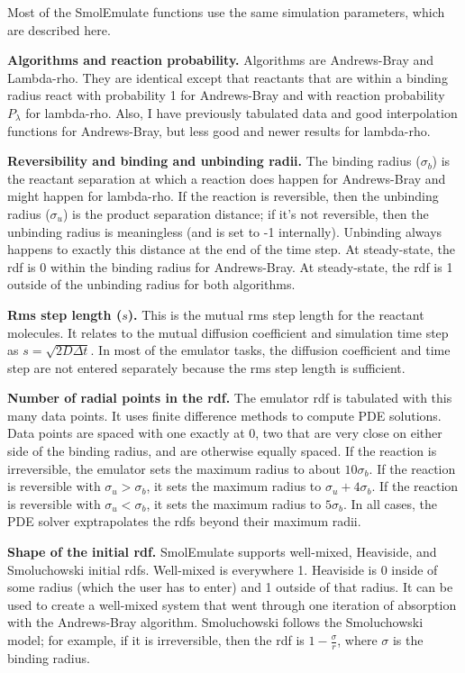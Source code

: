 \documentclass {book}
\begin{document}
Most of the SmolEmulate functions use the same simulation parameters, which are described here.

\textbf{Algorithms and reaction probability.} Algorithms are Andrews-Bray and Lambda-rho. They are identical except that reactants that are within a binding radius react with probability 1 for Andrews-Bray and with reaction probability $P_\lambda$ for lambda-rho.  Also, I have previously tabulated data and good interpolation functions for Andrews-Bray, but less good and newer results for lambda-rho.

\textbf{Reversibility and binding and unbinding radii.} The binding radius ($\sigma_b$) is the reactant separation at which a reaction does happen for Andrews-Bray and might happen for lambda-rho. If the reaction is reversible, then the unbinding radius ($\sigma_u$) is the product separation distance; if it's not reversible, then the unbinding radius is meaningless (and is set to -1 internally). Unbinding always happens to exactly this distance at the end of the time step. At steady-state, the rdf is 0 within the binding radius for Andrews-Bray. At steady-state, the rdf is 1 outside of the unbinding radius for both algorithms.

\textbf{Rms step length ($s$).} This is the mutual rms step length for the reactant molecules. It relates to the mutual diffusion coefficient and simulation time step as $s=\sqrt{2 D \Delta t}$. In most of the emulator tasks, the diffusion coefficient and time step are not entered separately because the rms step length is sufficient.

\textbf{Number of radial points in the rdf.} The emulator rdf is tabulated with this many data points. It uses finite difference methods to compute PDE solutions. Data points are spaced with one exactly at 0, two that are very close on either side of the binding radius, and are otherwise equally spaced. If the reaction is irreversible, the emulator sets the maximum radius to about $10\sigma_b$. If the reaction is reversible with $\sigma_u>\sigma_b$, it sets the maximum radius to $\sigma_u+4\sigma_b$. If the reaction is reversible with $\sigma_u<\sigma_b$, it sets the maximum radius to $5\sigma_b$. In all cases, the PDE solver exptrapolates the rdfs beyond their maximum radii.

\textbf{Shape of the initial rdf.} SmolEmulate supports well-mixed, Heaviside, and Smoluchowski initial rdfs. Well-mixed is everywhere 1. Heaviside is 0 inside of some radius (which the user has to enter) and 1 outside of that radius. It can be used to create a well-mixed system that went through one iteration of absorption with the Andrews-Bray algorithm. Smoluchowski follows the Smoluchowski model; for example, if it is irreversible, then the rdf is $1-\frac{\sigma}{r}$, where $\sigma$ is the binding radius.
\end{document}
